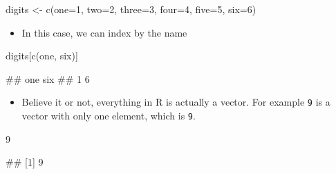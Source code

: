 \documentclass[
]{book}
\newenvironment{Shaded}{\begin{snugshade}}{\end{snugshade}}
\newcommand{\DecValTok}[1]{\textcolor[rgb]{0.00,0.00,0.81}{#1}}
\newcommand{\FunctionTok}[1]{\textcolor[rgb]{0.00,0.00,0.00}{#1}}
\newcommand{\NormalTok}[1]{#1}
\newcommand{\OtherTok}[1]{\textcolor[rgb]{0.56,0.35,0.01}{#1}}
\newcommand{\StringTok}[1]{\textcolor[rgb]{0.31,0.60,0.02}{#1}}
\providecommand{\tightlist}{%
  \setlength{\itemsep}{0pt}\setlength{\parskip}{0pt}}
\begin{document}
\begin{Shaded}
\begin{Highlighting}[]
\NormalTok{digits }\OtherTok{\textless{}{-}} \FunctionTok{c}\NormalTok{(}\StringTok{\textquotesingle{}one\textquotesingle{}}\OtherTok{=}\DecValTok{1}\NormalTok{, }\StringTok{\textquotesingle{}two\textquotesingle{}}\OtherTok{=}\DecValTok{2}\NormalTok{, }\StringTok{\textquotesingle{}three\textquotesingle{}}\OtherTok{=}\DecValTok{3}\NormalTok{, }\StringTok{\textquotesingle{}four\textquotesingle{}}\OtherTok{=}\DecValTok{4}\NormalTok{, }\StringTok{\textquotesingle{}five\textquotesingle{}}\OtherTok{=}\DecValTok{5}\NormalTok{, }\StringTok{\textquotesingle{}six\textquotesingle{}}\OtherTok{=}\DecValTok{6}\NormalTok{)}
\end{Highlighting}
\end{Shaded}

\begin{itemize}
\tightlist
\item
  In this case, we can index by the name
\end{itemize}

\begin{Shaded}
\begin{Highlighting}[]
\NormalTok{digits[}\FunctionTok{c}\NormalTok{(}\StringTok{\textquotesingle{}one\textquotesingle{}}\NormalTok{, }\StringTok{\textquotesingle{}six\textquotesingle{}}\NormalTok{)]}
\end{Highlighting}
\end{Shaded}

\begin{Shaded}
\begin{Highlighting}[]
\NormalTok{\#\# one six }
\NormalTok{\#\#   1   6}
\end{Highlighting}
\end{Shaded}

\begin{itemize}
\tightlist
\item
  Believe it or not, everything in R is actually a vector. For example \texttt{9} is a vector with only one element, which is \texttt{9}.
\end{itemize}

\begin{Shaded}
\begin{Highlighting}[]
\DecValTok{9}
\end{Highlighting}
\end{Shaded}

\begin{Shaded}
\begin{Highlighting}[]
\NormalTok{\#\# [1] 9}
\end{Highlighting}
\end{Shaded}
\end{document}
